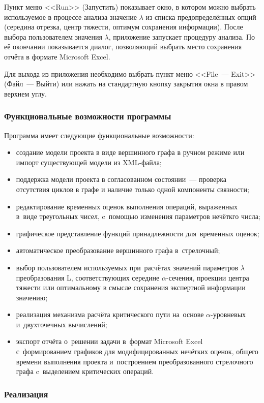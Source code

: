 Пункт меню <<Run>> (Запустить) показывает окно, в котором можно выбрать используемое в процессе анализа значение $\lambda$ из списка предопределённых опций (середина отрезка, центр тяжести, оптимум сохранения информации). После выбора пользователем значения $\lambda$, приложение запускает процедуру анализа. По её окончании показывается диалог, позволяющий выбрать место сохранения отчёта в формате Microsoft Excel.

Для выхода из приложения необходимо выбрать пункт меню <<File~--- Exit>> (Файл~--- Выйти) или нажать на стандартную кнопку закрытия окна в правом верхнем углу.

\subsubsection*{Функциональные возможности программы}
Программа имеет следующие функциональные возможности:
\begin{itemize}
  \item создание модели проекта в виде вершинного графа в ручном режиме или импорт существующей модели из XML-файла;
  \item поддержка модели проекта в согласованном состоянии~--- проверка отсутствия циклов в графе и наличие только одной компоненты связности;
  \item редактирование временных оценок выполнения операций, выраженных в~виде треугольных чисел, c~помощью изменения параметров нечёткго числа;
  \item графическое представление функций принадлежности для~временных оценок;
  \item автоматическое преобразование вершинного графа в~стрелочный;
  \item выбор пользователем используемых при~расчётах значений параметров $\lambda$ преобразования L, соответствующих середине $\alpha$-сечения, проекции центра тяжести или оптимальному в смысле сохранения экспертной информации значению;
  \item реализация механизма расчёта критического пути на~основе $\alpha$-уровневых и~двухточечных вычислений;
  \item экспорт отчёта о~решении задачи в~формат Microsoft Excel с~формированием графиков для модифицированных нечётких оценок, общего времени выполнения проекта и~построением преобразованного стрелочного графа c~выделением критических операций.
\end{itemize}

\subsubsection*{Реализация}


